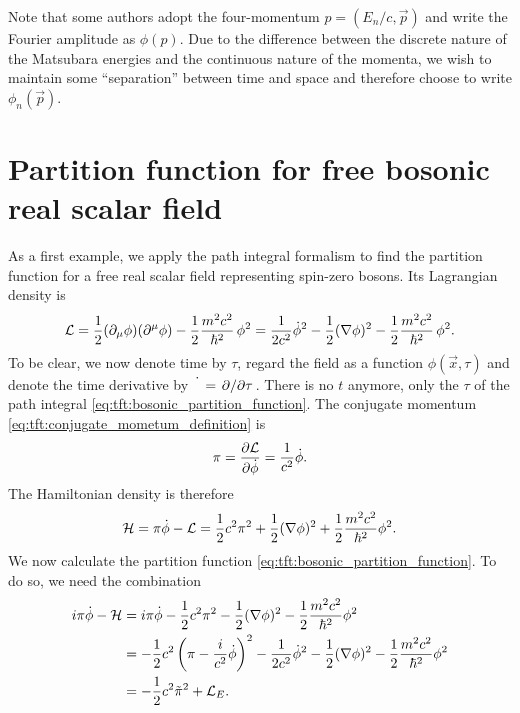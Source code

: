 Note that some authors adopt the four-momentum $p = (E_n/c, \vec{p})$ and write the Fourier amplitude as $\phi(p)$.
Due to the difference between the discrete nature of the Matsubara energies and the continuous nature of the momenta, we wish to maintain some ``separation'' between time and space and therefore choose to write $\phi_n(\vec{p})$.

\section{Partition function for free bosonic real scalar field}

As a first example, we apply the path integral formalism to find the partition function for a free real scalar field representing spin-zero bosons.
Its Lagrangian density is
\begin{equation}
	\mathcal{L} = \frac{1}{2} (\partial_\mu \phi) (\partial^\mu \phi) - \frac12 \frac{m^2 c^2}{\hbar^2} \, \phi^2
	      = \frac{1}{2 c^2} \dot{\phi}^2 - \frac12 (\nabla \phi)^2  - \frac12 \frac{m^2 c^2}{\hbar^2} \, \phi^2 .
\label{eq:tft:boson_lagrangian}
\end{equation}
To be clear, we now denote time by $\tau$, regard the field as a function $\phi(\vec{x}, \tau)$ and denote the time derivative by $\dot{\phantom{\phi}} = \pdv{}/{\tau}$.
There is no $t$ anymore, only the $\tau$ of the path integral \eqref{eq:tft:bosonic_partition_function}.
The conjugate momentum \eqref{eq:tft:conjugate_mometum_definition} is
\begin{equation}
	\pi = \pdv{\mathcal{L}}{\dot{\phi}} = \frac{1}{c^2} \dot{\phi} .
\end{equation}
The Hamiltonian density is therefore
\begin{equation}
	\mathcal{H} = \pi \dot{\phi} - \mathcal{L} = \frac12 c^2 \pi^2 + \frac12 (\nabla \phi)^2 + \frac12 \frac{m^2 c^2}{\hbar^2} \phi^2 .
\label{eq:tft:boson_hamiltonian}
\end{equation}
We now calculate the partition function \eqref{eq:tft:bosonic_partition_function}.
To do so, we need the combination
\begin{equation}
\begin{split}
	i \pi \dot\phi - \mathcal{H} &= i \pi \dot\phi - \frac{1}{2} c^2 \pi^2 - \frac12 (\nabla \phi)^2 - \frac{1}{2} \frac{m^2 c^2}{\hbar^2} \phi^2 \\
	                      &= -\frac{1}{2} c^2 \left( \pi - \frac{i}{c^2} \dot\phi \right)^2 - \frac{1}{2 c^2} \dot\phi^2 - \frac{1}{2} (\nabla \phi)^2 - \frac{1}{2} \frac{m^2 c^2}{\hbar^2} \phi^2 \\
	                      &= -\frac{1}{2} c^2 \tilde\pi^2 + \mathcal{L}_E . \\
\end{split}
\label{eq:tft:boson_field_combination}
\end{equation}
